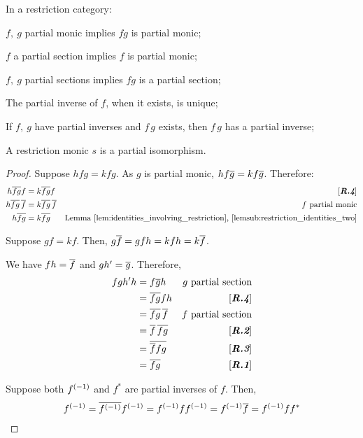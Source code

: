 \begin{lemma}\label{lem:rcs_partial_monic_section_inverse_properties}
In a restriction category:
\bproofenum
\item $f,\ g$ partial monic implies $f g$ is partial monic;
\item $f$ a partial section implies $f$ is partial monic;
\item $f,\ g$ partial sections implies $f g$ is a partial section;
\item The partial inverse of $f$, when it exists, is unique;
\item If $f,\ g$ have partial inverses and $f\,g$ exists, then $f\,g$ has a partial inverse;
\item A restriction monic $s$ is a partial isomorphism.
\eproofenum
\end{lemma}
\begin{proof}
\bproofenum
\item Suppose $h f g = k f g$. As $g$ is partial monic,
$h f \overline{g} = k f \overline{g}$. Therefore:
\begin{align*}
h \overline{f g} f &= k \overline{f g} f &[\emph{\bfseries R.4}]\\
h \overline{f g}\,\overline{f} &= k \overline{f g}\, \overline{f} & f\text{
partial monic}\\
h \overline{fg}&= k \overline{fg} & \text{Lemma
\ref{lem:identities_involving_restriction}, \ref{lemsub:restriction_identities_two}}
\end{align*}
\item Suppose $g f = k f$. Then, $g\overline{f} = g f h = k f h = k \overline{f}$.
\item We have $f h = \overline{f}$ and $g h' = \overline{g}$. Therefore,
\begin{align*}
f g h' h &= f \overline{g} h & g \text{ partial section}\\
&= \overline{f g} f h & [\emph{\bfseries R.4}]\\
&= \overline{f g}\, \overline{f} & f \text{ partial section}\\
&= \overline{f}\, \overline{f g} & [\emph{\bfseries R.2}]\\
&= \overline{\overline{f}f g} & [\emph{\bfseries R.3}]\\
&= \overline{f g} & [\emph{\bfseries R.1}]
\end{align*}
\item Suppose both ${f}^{(-1)}$ and $f^*$ are partial inverses of $f$. Then,
\begin{multline*}
\inv{f}
= \restr{\inv{f}}\inv{f} %
=\inv{f}f\inv{f}  %
= \inv{f} \restr{f}   %
= \inv{f} f f^*   %

\end{multline*}
\end{proof}
